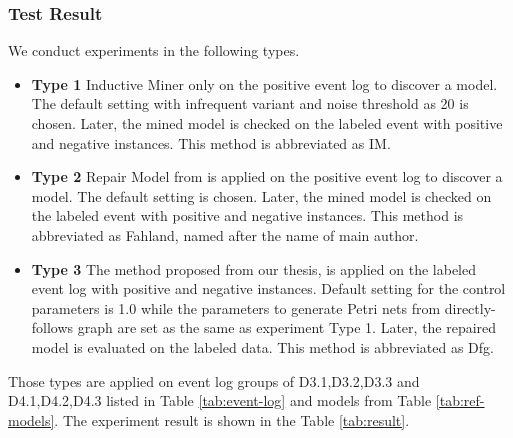 \subsubsection{Test Result}
We conduct experiments in the following types.
\begin{itemize}
	\item \textbf{Type 1} Inductive Miner only on the positive event log to discover a model. The default setting with infrequent variant and noise threshold as 20 is chosen. Later, the mined model is checked on the labeled event with positive and negative instances. This method is abbreviated as IM.
	\item \textbf{Type 2} Repair Model from \cite{fahland2015model} is applied on the positive event log to discover a model. The default setting is chosen. Later, the mined model is checked on the labeled event with positive and negative instances. This method is abbreviated as Fahland, named after the name of main author.
	\item \textbf{Type 3} The method proposed from our thesis, is applied on the labeled event log with positive and negative instances. Default setting  for the control parameters is 1.0 while the parameters to generate Petri nets from directly-follows graph are set as the same as experiment Type 1.  Later, the repaired model is evaluated on the labeled data. This method is abbreviated as Dfg.
\end{itemize}
Those types are applied on event log groups of {D3.1,D3.2,D3.3} and {D4.1,D4.2,D4.3} listed in Table \ref{tab:event-log} and models from Table \ref{tab:ref-models}. The experiment result is shown in the Table \ref{tab:result}. 

